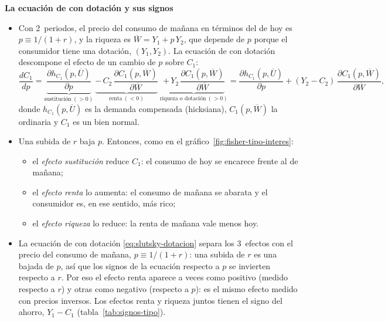 \documentclass[11pt]{article}
\begin{document}
\begin{anotaciones}
\textbf{La ecuación de  con dotación y sus signos}
\begin{itemize}
\item Con 2~periodos, el precio del consumo de mañana en términos del de hoy es $p\equiv 1/(1+r)$, y la riqueza es $\overline{W}=Y_1+p\,Y_2$, que depende de $p$ porque el consumidor tiene una dotación, $(Y_1,Y_2)$. La ecuación de  con dotación  descompone el efecto de un cambio de $p$ sobre $C_1$:
  \begin{equation}
  \frac{dC_1}{dp}=\underbrace{\frac{\partial h_{C_1}(p,\overline{U})}{\partial p}}_{\text{sustitución}\ (>0)}\ \underbrace{-\,C_2\,\frac{\partial C_1(p,\overline{W})}{\partial\overline{W}}}_{\text{renta}\ (<0)}\ \underbrace{+\,Y_2\,\frac{\partial C_1(p,\overline{W})}{\partial\overline{W}}}_{\text{riqueza o dotación}\ (>0)}=\frac{\partial h_{C_1}(p,\overline{U})}{\partial p}+(Y_2-C_2)\,\frac{\partial C_1(p,\overline{W})}{\partial\overline{W}},\label{eq:slutsky-dotacion}
  \end{equation}
  donde $h_{C_1}(p,\overline{U})$ es la demanda compensada (hicksiana), $C_1(p,\overline{W})$ la ordinaria y $C_1$ es un bien normal.
\item Una subida de $r$ baja $p$. Entonces, como en el gráfico~\ref{fig:fisher-tipo-interes}:
  \begin{itemize}
  \item el \emph{efecto sustitución} reduce $C_1$: el consumo de hoy se encarece frente al de mañana;
  \item el \emph{efecto renta} lo aumenta: el consumo de mañana se abarata y el consumidor es, en ese sentido, más rico;
  \item el \emph{efecto riqueza} lo reduce: la renta de mañana vale menos hoy.
  \end{itemize}
\item La ecuación de  con dotación \eqref{eq:slutsky-dotacion} separa los 3~efectos con el precio del consumo de mañana, $p\equiv1/(1+r)$: una subida de $r$ es una bajada de $p$, así que los signos de la ecuación respecto a $p$ se invierten respecto a $r$. Por eso el efecto renta aparece a veces como positivo (medido respecto a $r$) y otras como negativo (respecto a $p$): es el mismo efecto medido con precios inversos. Los efectos renta y riqueza juntos tienen el signo del ahorro, $Y_1-C_1$ (tabla~\ref{tab:signos-tipo}).
\end{itemize}
  \begin{tablacaja}

\end{tablacaja}
\end{anotaciones}
\end{document}

